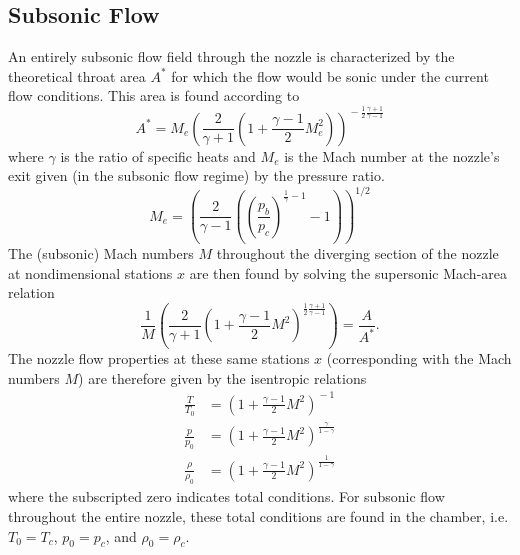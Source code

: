 \documentclass[11pt,dvipsnames]{thesis}
\begin{document}
\subsection{Subsonic Flow}
An entirely subsonic flow field through the nozzle is characterized by the theoretical throat area $A^*$ for which the flow would be sonic under the current flow conditions. This area is found according to
\begin{equation}
A^* = M_e \left(\frac{2}{\gamma + 1} \left(1 + \frac{\gamma - 1}{2} M_e^2\right)\right)^{\!-\frac{1}{2} \frac{\gamma + 1}{\gamma - 1}}
\end{equation}
where $\gamma$ is the ratio of specific heats and $M_e$ is the Mach number at the nozzle's exit given (in the subsonic flow regime) by the pressure ratio.
\begin{equation}
M_e = \left(\frac{2}{\gamma - 1}\left(\left(\frac{p_b}{p_c}\right)^{\!\frac{1}{\gamma} - 1} - 1\right)\right)^{\!1/2} \label{eq:MachNumberAtExitNoShocks}
\end{equation}
The (subsonic) Mach numbers $M$ throughout the diverging section of the nozzle at nondimensional stations $x$ are then found by solving the supersonic Mach-area relation
\begin{equation}
\frac{1}{M}\left(\frac{2}{\gamma + 1} \left(1 + \frac{\gamma - 1}{2} M^2\right)^{\!\frac{1}{2}\frac{\gamma + 1}{\gamma - 1}}\right) = \frac{A}{A^*}. \label{eq:SupersonicMachAreaRelation}
\end{equation}
The nozzle flow properties at these same stations $x$ (corresponding with the Mach numbers $M$) are therefore given by the isentropic relations
\begin{align}
\frac{T}{T_0} &= \left(1 + \frac{\gamma - 1}{2}M^2\right)^{\!-1} \label{eq:SupersonicFlowTemp} \\
\frac{p}{p_0} &= \left(1 + \frac{\gamma - 1}{2}M^2\right)^{\!\frac{\gamma}{1 - \gamma}} \label{eq:SupersonicFlowPressure} \\
\frac{\rho}{\rho_0} &= \left(1 + \frac{\gamma - 1}{2}M^2\right)^{\!\frac{1}{1 - \gamma}} \label{eq:SupersonicFlowDensity} 
\end{align}
where the subscripted zero indicates total conditions. For subsonic flow throughout the entire nozzle, these total conditions are found in the chamber, i.e. $T_0 = T_c$, $p_0 = p_c$, and $\rho_0 = \rho_c$.
\end{document}
